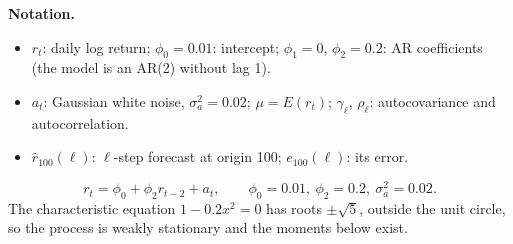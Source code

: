 \documentclass[11pt,a4paper]{article}
\newenvironment{notacao}{\par\smallskip\noindent\textbf{Notation.}\begin{itemize}[leftmargin=1.4em,topsep=1pt,itemsep=0pt]\small}{\end{itemize}}
\begin{document}
\begin{sol}
\begin{notacao}
\item $r_t$: daily log return; $\phi_0=0.01$: intercept; $\phi_1=0$, $\phi_2=0.2$: AR coefficients (the model is an AR(2) without lag 1).
\item $a_t$: Gaussian white noise, $\sigma_a^2=0.02$; $\mu=E(r_t)$; $\gamma_\ell$, $\rho_\ell$: autocovariance and autocorrelation.
\item $\hat r_{100}(\ell)$: $\ell$-step forecast at origin 100; $e_{100}(\ell)$: its error.
\end{notacao}
\begin{equation}\label{q22:model} r_t = \phi_0 + \phi_2 r_{t-2} + a_t, \qquad \phi_0=0.01,\ \phi_2=0.2,\ \sigma_a^2=0.02. \end{equation}
The characteristic equation $1-0.2x^2=0$ has roots $\pm\sqrt{5}$, outside the unit circle, so the process is
weakly stationary and the moments below exist.


\end{sol}
\end{document}
